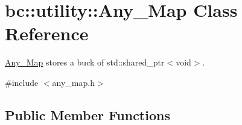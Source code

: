 \hypertarget{classbc_1_1utility_1_1Any__Map}{}\section{bc\+:\+:utility\+:\+:Any\+\_\+\+Map Class Reference}
\label{classbc_1_1utility_1_1Any__Map}


\hyperlink{classbc_1_1utility_1_1Any__Map}{Any\+\_\+\+Map} stores a buck of std\+::shared\+\_\+ptr$<$void$>$.  




{\ttfamily \#include $<$any\+\_\+map.\+h$>$}

\subsection*{Public Member Functions}

